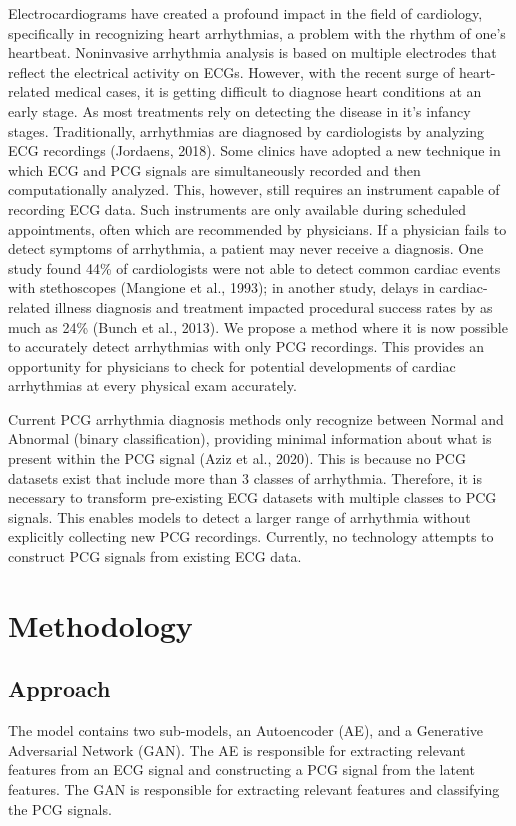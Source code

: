 \documentclass{article}
\begin{document}
Electrocardiograms have created a profound impact in the field of cardiology, specifically in recognizing heart arrhythmias, a problem with the rhythm of one’s heartbeat. Noninvasive arrhythmia analysis is based on multiple electrodes that reflect the electrical activity on ECGs. However, with the recent surge of heart-related medical cases, it is getting difficult to diagnose heart conditions at an early stage. As most treatments rely on detecting the disease in it's infancy stages. Traditionally, arrhythmias are diagnosed by cardiologists by analyzing ECG recordings (Jordaens, 2018). Some clinics have adopted a new technique in which ECG and PCG signals are simultaneously recorded and then computationally analyzed. This, however, still requires an instrument capable of recording ECG data. Such instruments are only available during scheduled appointments, often which are recommended by physicians.
If a physician fails to detect symptoms of arrhythmia, a patient may never receive a diagnosis. One study found 44\% of cardiologists were not able to detect common cardiac events with stethoscopes (Mangione et al., 1993); in another study, delays in cardiac-related illness diagnosis and treatment impacted procedural success rates by as much as 24\% (Bunch et al., 2013). We propose a method where it is now possible to accurately detect arrhythmias with only PCG recordings. This provides an opportunity for physicians to check for potential developments of cardiac arrhythmias at every physical exam accurately.

Current PCG arrhythmia diagnosis methods only recognize between Normal and Abnormal (binary classification), providing minimal information about what is present within the PCG signal (Aziz et al., 2020). This is because no PCG datasets exist that include more than 3 classes of arrhythmia. Therefore, it is necessary to transform pre-existing ECG datasets with multiple classes to PCG signals. This enables models to detect a larger range of arrhythmia without explicitly collecting new PCG recordings. Currently, no technology attempts to construct PCG signals from existing ECG data.

\section{Methodology}

\subsection{Approach}
The model contains two sub-models, an Autoencoder (AE), and a Generative Adversarial Network (GAN). The AE is responsible for extracting relevant features from an ECG signal and constructing a PCG signal from the latent features. The GAN is responsible for extracting relevant features and classifying the PCG signals.
\end{document}
